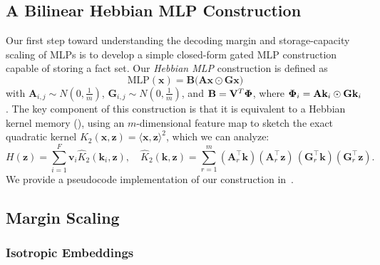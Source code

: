 \subsection{A Bilinear Hebbian MLP Construction}
\label{sec:isotropic-case}
\label{sec:isotropic-embeddings}
\label{sec:sketched-k2}
\label{sec:construction}
Our first step toward understanding the decoding margin and storage-capacity
scaling of MLPs is to develop a simple closed-form gated MLP construction capable of storing a fact set. Our \emph{Hebbian MLP} construction is defined as
\begin{equation}\label{eq:mlp-construction}
\mathrm{MLP}(\mathbf{x}) = \mathbf{B}\bigl(\mathbf{A}\mathbf{x} \odot \mathbf{G}\mathbf{x}\bigr)
\end{equation}
with $\mathbf{A}_{i,j}\sim N(0, \frac{1}{m})$, $\mathbf{G}_{i,j}\sim N(0, \frac{1}{m})$, and $\mathbf{B}=\mathbf{V}^T{\bm{\Phi}}$, where ${\bm{\Phi}}_{i}=\mathbf{A}\mathbf{k}_{i} \odot \mathbf{G}\mathbf{k}_{i}$.
The key component of this construction is that it is equivalent to a Hebbian kernel memory (), using an $m$-dimensional feature map to sketch the exact quadratic kernel $K_{2}(\mathbf{x},\mathbf{z}) = \langle \mathbf{x},\mathbf{z} \rangle^2$, which we can analyze:
\begin{equation}\label{eq:approx-quad-kernel}
H(\mathbf{z})= \sum_{i=1}^{F}\mathbf{v}_i\hat{K}_{2}(\mathbf{k}_i, \mathbf{z}), \quad \hat{K}_{2}(\mathbf{k},\mathbf{z})
=
\sum_{r=1}^m
(\mathbf{A}_{r}^\top \mathbf{k})(\mathbf{A}_{r}^\top \mathbf{z})\,
(\mathbf{G}_{r}^\top \mathbf{k})(\mathbf{G}_{r}^\top \mathbf{z}).
\end{equation}
We provide a pseudocode implementation of our construction in~.

\subsection{Margin Scaling}

\subsubsection{Isotropic Embeddings}

